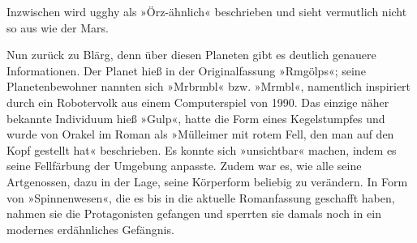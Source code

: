 \cleardoubleoddpage

%

\cleardoubleoddpage

%

\cleardoubleoddpage

%

\cleardoubleoddpage

%

\cleardoubleoddpage

%

\cleardoubleoddpage

%
%
%
%
%
%

Inzwischen wird ugghy als »Örz-ähnlich« beschrieben und sieht vermutlich nicht so aus wie der Mars.

Nun zurück zu Blärg, denn über diesen Planeten gibt es deutlich genauere Informationen. Der Planet hieß in der Originalfassung »Rmgölps«; seine Planetenbewohner nannten sich »Mrbrmbl« bzw. »Mrmbl«, namentlich inspiriert durch ein Robotervolk aus einem Computerspiel von 1990. Das einzige näher bekannte Individuum hieß »Gulp«, hatte die Form eines Kegelstumpfes und wurde von Orakel im Roman als »Mülleimer mit rotem Fell, den man auf den Kopf gestellt hat« beschrieben. Es konnte sich »unsichtbar« machen, indem es seine Fellfärbung der Umgebung anpasste. Zudem war es, wie alle seine Artgenossen, dazu in der Lage, seine Körperform beliebig zu verändern. In Form von »Spinnenwesen«, die es bis in die aktuelle Romanfassung geschafft haben, nahmen sie die Protagonisten gefangen und sperrten sie damals noch in ein modernes erdähnliches Gefängnis.

